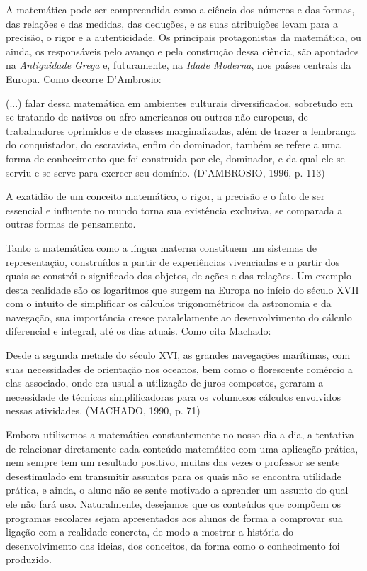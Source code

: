 \documentclass[brasil]{abnt}
\begin{document}
	A matemática pode ser compreendida como a ciência dos números e das formas, das relações e das medidas, das deduções, e as suas atribuições levam para a precisão, o rigor e a autenticidade.
	Os principais protagonistas da matemática, ou ainda, os responsáveis pelo avanço e pela construção dessa ciência, são apontados na \textit{Antiguidade Grega} e, futuramente, na \textit{Idade Moderna}, 
	nos países centrais da Europa. Como decorre D'Ambrosio:
			
	\begin{citacao}(...) falar dessa matemática em ambientes culturais diversificados, sobretudo em se tratando de nativos ou afro-americanos ou outros não europeus, de trabalhadores oprimidos e de classes 
		marginalizadas, além de trazer a lembrança do conquistador, do escravista, enfim do dominador, também se refere a uma forma de conhecimento que foi construída por ele, dominador, e da qual ele se serviu
		e se serve para exercer seu domínio. (D'AMBROSIO, 1996, p. 113)
	\end{citacao}
			  
	A exatidão de um conceito matemático, o rigor, a precisão e o fato de ser essencial e influente no mundo torna sua existência exclusiva, se comparada a outras formas de pensamento. 	
	    
    Tanto a matemática como a língua materna constituem um sistemas de representação, construídos a partir de experiências vivenciadas e a partir dos quais se 
    constrói o significado  dos objetos, de ações e das relações. Um exemplo desta realidade são os logaritmos que surgem na Europa no início do século XVII com 
    o intuito de simplificar os cálculos trigonométricos da astronomia e da navegação, sua importância cresce paralelamente ao desenvolvimento do cálculo 
    diferencial e integral, até os dias atuais. Como cita Machado:
    
    \begin{citacao} Desde a segunda metade do século XVI, as grandes navegações marítimas, com suas necessidades de orientação nos oceanos, bem como o florescente comércio a 
					elas associado, onde era usual a utilização de juros compostos, geraram a necessidade de técnicas simplificadoras para os volumosos cálculos envolvidos nessas 
					atividades. (MACHADO, 1990, p. 71)
    \end{citacao}
    
    Embora utilizemos a matemática constantemente no nosso dia a dia, a tentativa de relacionar diretamente cada conteúdo matemático com uma aplicação prática, 
    nem sempre tem um resultado positivo, muitas das vezes o professor se sente desestimulado em transmitir assuntos para os quais não se encontra utilidade prática, 
    e ainda, o aluno não se sente motivado a aprender um assunto do qual ele não fará uso. Naturalmente, desejamos que os conteúdos que compõem os programas escolares sejam apresentados 
    aos alunos de forma a comprovar sua ligação com a realidade concreta, de  modo a mostrar a história do desenvolvimento das ideias, dos conceitos, da forma como o conhecimento foi produzido.
    
\end{document}
